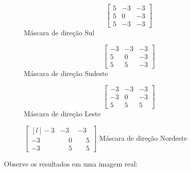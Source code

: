 \documentclass[a4paper, 12pt]{article}
\begin{document}
\begin{figure}[!htb]
	\begin{minipage}{.23\linewidth}
	  \centering
	  \[\left[\begin{array}{ccc}
		5 &  -3 &  -3 \\
		5 &   0 &  -3 \\
		5 &  -3 &  -3
	  \end{array}\right]\]
	  Máscara de direção Sul
	\end{minipage}%
	\begin{minipage}{.23\linewidth}
	  \centering
	  \[\left[\begin{array}{ccc}
	   -3 & -3  & -3 \\
		5 &  0  & -3 \\
		5 &  5  & -3
	  \end{array}\right]\]
	  Máscara de direção Sudeste
	\end{minipage}
	\begin{minipage}{.23\linewidth}
		\centering
		\[\left[\begin{array}{ccc}
		  -3 &  -3  & -3 \\
		  -3 &   0  & -3 \\
		   5 &   5  &  5
		\end{array}\right]\]
		Máscara de direção Leste
	  \end{minipage}
	  \begin{minipage}{.23\linewidth}
		\centering
		$
		\begin{bmatrix*}[l]
		             -3 &            -3   &             -3 \\
		             -3 &  \phantom{-}0   & \phantom{-}  5 \\
		             -3 &  \phantom{-}5   & \phantom{-}  5
		\end{bmatrix*}
		$
		Máscara de direção Nordeste
	  \end{minipage}
  \end{figure}
  Observe os resultados em uma imagem real:
\end{document}
